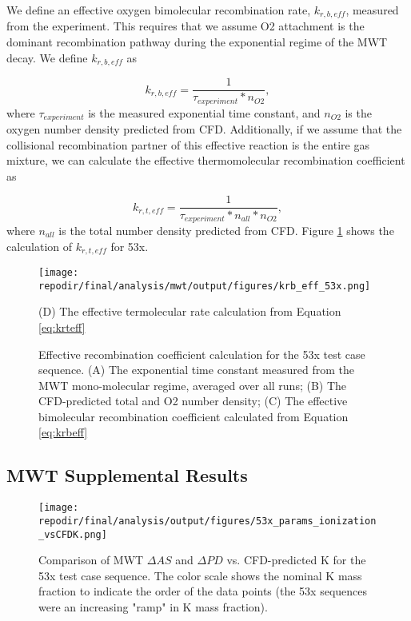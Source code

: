 We define an effective oxygen bimolecular recombination rate, $k_{r,b,eff}$, measured from the experiment. This requires that we assume O2 attachment is the dominant recombination pathway during the exponential regime of the MWT decay. We define $k_{r,b,eff}$ as 

\begin{equation}
    \label{eq:krbeff}
    k_{r,b,eff} = \frac{1}{\tau_{experiment} *  n_{O2}},
\end{equation}
where $\tau_{experiment}$ is the measured exponential time constant,  and $n_{O2}$ is the oxygen number density predicted from CFD. Additionally, if we assume that the collisional recombination partner of this effective reaction is the entire gas mixture, we can calculate the effective thermomolecular recombination coefficient as


\begin{equation}
    \label{eq:krteff}
    k_{r,t,eff} = \frac{1}{\tau_{experiment} * n_{all} *  n_{O2}},
\end{equation}
where $n_{all}$ is the total number density predicted from CFD. Figure \ref{fig:SI_krb_eff_53x} shows the calculation of $k_{r,t,eff}$ for 53x.

\begin{figure}[]
\centering
\texttt{[image: \\repodir/final/analysis/mwt/output/figures/krb\_eff\_53x.png]}
\caption{Effective recombination coefficient calculation for the 53x test case sequence. (A) The exponential time constant measured from the MWT mono-molecular regime, averaged over all runs; (B) The CFD-predicted total and O2 number density; (C) The effective bimolecular recombination coefficient calculated from Equation \ref{eq:krbeff}} (D) The effective termolecular rate calculation from Equation \ref{eq:krteff}
\label{fig:SI_krb_eff_53x}
\end{figure}

\clearpage
\subsection{MWT Supplemental Results}

\begin{figure}[h]
    \centering
    \texttt{[image: \\repodir/final/analysis/output/figures/53x\_params\_ionization\_vsCFDK.png]} 
    \caption{Comparison of MWT $\Delta AS$ and $\Delta PD$ vs. CFD-predicted K for the 53x test case sequence. The color scale shows the nominal K mass fraction to indicate the order of the data points (the 53x sequences were an increasing "ramp" in K mass fraction).}
    \label{fig:SI_53x_params_ionization_vsCFDK}
\end{figure}

